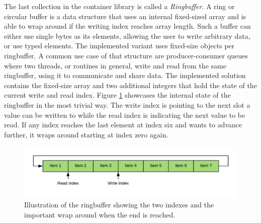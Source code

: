 The last collection in the container library is called a \textit{Ringbuffer}. A ring or circular buffer is a data structure that uses an internal fixed-sized array and is able to wrap around if the writing index reaches array length. Such a buffer can either use single bytes as its elements, allowing the user to write arbitrary data, or use typed elements. The implemented variant uses fixed-size objects per ringbuffer. A common use case of that structure are producer-consumer queues where two threads, or routines in general, write and read from the same ringbuffer, using it to communicate and share data. The implemented solution contains the fixed-size array and two additional integers that hold the state of the current write and read index. Figure \ref{fig:ringbuffer} showcases the internal state of the ringbuffer in the most trivial way. The write index is pointing to the next slot a value can be written to while the read index is indicating the next value to be read. If any index reaches the last element at index six and wants to advance further, it wraps around starting at index zero again.

\begin{figure}[h!]
	\centering \includegraphics[width=\linewidth]{PICs/ringbuffer.png}
	\caption{Illustration of the ringbuffer showing the two indexes and the important wrap around when the end is reached.}
	\label{fig:ringbuffer}
\end{figure}


